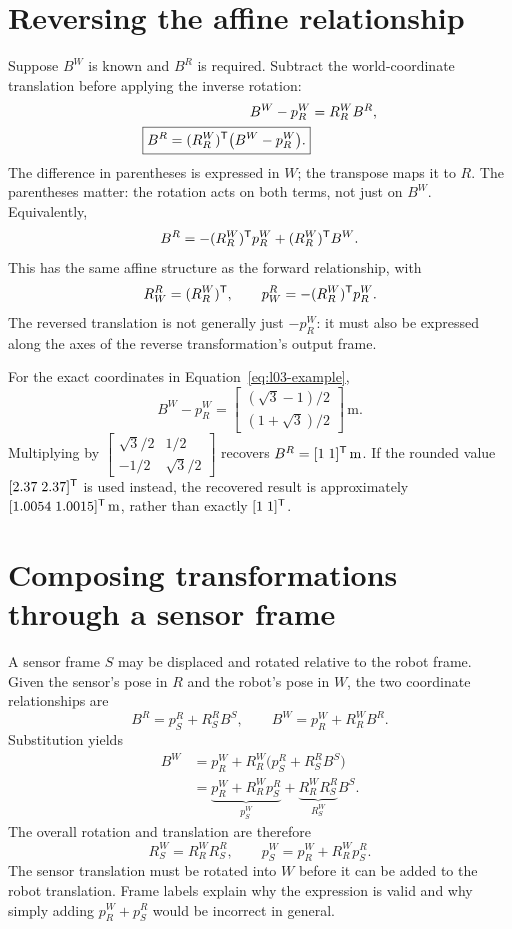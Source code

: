\section{Reversing the affine relationship}
Suppose $B^W$ is known and $B^R$ is required. Subtract the world-coordinate
translation before applying the inverse rotation:
\begin{align}
 B^W-p_R^W&=R_R^W B^R,\\
 \boxed{B^R=(R_R^W)^{\mathsf T}\bigl(B^W-p_R^W\bigr).}
 \label{eq:l03-affine-inverse}
\end{align}
The difference in parentheses is expressed in $W$; the transpose maps it to
$R$. The parentheses matter: the rotation acts on both terms, not just on $B^W$.
Equivalently,
\begin{equation}
 B^R=-(R_R^W)^{\mathsf T} p_R^W+(R_R^W)^{\mathsf T} B^W.
 \label{eq:l03-inverse-expanded}
\end{equation}
This has the same affine structure as the forward relationship, with
\begin{equation}
 R_W^R=(R_R^W)^{\mathsf T},\qquad p_W^R=-(R_R^W)^{\mathsf T} p_R^W.
 \label{eq:l03-reverse-pose}
\end{equation}
The reversed translation is not generally just $-p_R^W$: it must also be
expressed along the axes of the reverse transformation's output frame.

For the exact coordinates in Equation~\eqref{eq:l03-example},
\[
 B^W-p_R^W=\begin{bmatrix}(\sqrt3-1)/2\\(1+\sqrt3)/2\end{bmatrix}\,\mathrm{m}.
\]
Multiplying by
$\begin{bmatrix}\sqrt3/2&1/2\\-1/2&\sqrt3/2\end{bmatrix}$
recovers $B^R=[1\;1]^{\mathsf T}\,\mathrm{m}$. If the rounded value
$[2.37\;2.37]^{\mathsf T}$ is used instead, the recovered result is approximately
$[1.0054\;1.0015]^{\mathsf T}\,\mathrm{m}$, rather than exactly $[1\;1]^{\mathsf T}$.

\section{Composing transformations through a sensor frame}
A sensor frame $S$ may be displaced and rotated relative to the robot frame.
Given the sensor's pose in $R$ and the robot's pose in $W$, the two coordinate
relationships are
\[
 B^R=p_S^R+R_S^R B^S,\qquad B^W=p_R^W+R_R^W B^R.
\]
Substitution yields
\begin{align}
 B^W&=p_R^W+R_R^W\bigl(p_S^R+R_S^R B^S\bigr)\\
 &=\underbrace{p_R^W+R_R^W p_S^R}_{p_S^W}
 +\underbrace{R_R^W R_S^R}_{R_S^W}B^S.
 \label{eq:l03-composition-expanded}
\end{align}
The overall rotation and translation are therefore
\begin{equation}
 \boxed{R_S^W=R_R^W R_S^R,\qquad
 p_S^W=p_R^W+R_R^W p_S^R.}
\end{equation}
The sensor translation must be rotated into $W$ before it can be added to
the robot translation. Frame labels explain why the expression is valid and
why simply adding $p_R^W+p_S^R$ would be incorrect in general.

